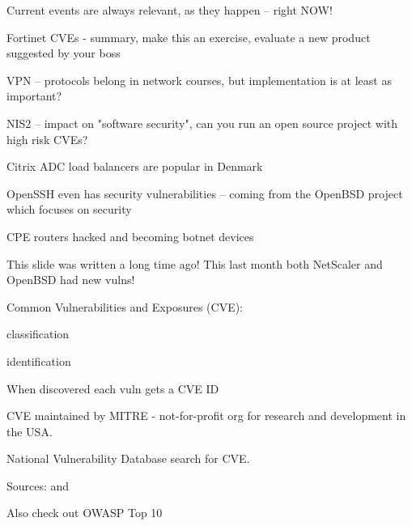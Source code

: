 \documentclass[Screen16to9,17pt]{foils}
\begin{document}

Current events are always relevant, as they happen -- right NOW!
\begin{list2}
\item Fortinet CVEs - summary, make this an exercise, evaluate a new product suggested by your boss
\item VPN -- protocols belong in network courses, but implementation is at least as important?
\item NIS2 -- impact on "software security", can you run an open source project with high risk CVEs?
\item Citrix ADC load balancers are popular in Denmark
\item OpenSSH even has security vulnerabilities -- coming from the OpenBSD project which focuses on security
\item CPE routers hacked and becoming botnet devices
\end{list2}

This slide was written a long time ago! This last month both NetScaler and OpenBSD had new vulns!


\begin{list1}
\item Common Vulnerabilities and Exposures (CVE):
  \begin{list2}
  \item classification
  \item identification
  \end{list2}
\item When discovered each vuln gets a CVE ID
\item CVE maintained by MITRE - not-for-profit
org for research and development in the USA.
\item National Vulnerability Database search for CVE.
\item Sources:  and 
\item Also check out OWASP Top 10 
\end{list1}


\end{document}
